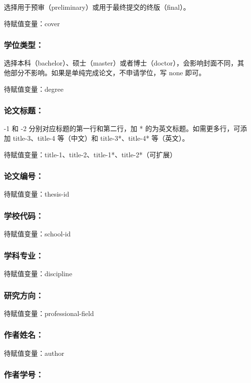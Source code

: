 选择用于预审（preliminary）或用于最终提交的终版（final）。

待赋值变量：cover

\subsubsection{学位类型：}

选择本科（bachelor）、硕士（master）或者博士（doctor），会影响封面不同，其他部分不影响。如果是单纯完成论文，不申请学位，写 none 即可。

待赋值变量：degree

\subsubsection{论文标题：}

-1 和 -2 分别对应标题的第一行和第二行，加 * 的为英文标题。如需更多行，可添加 title-3、title-4 等（中文）和 title-3*、title-4* 等（英文）。

待赋值变量：title-1、title-2、title-1*、title-2*（可扩展）

\subsubsection{论文编号：}

待赋值变量：thesis-id

\subsubsection{学校代码：}

待赋值变量：school-id

\subsubsection{学科专业：}

待赋值变量：discipline

\subsubsection{研究方向：}

待赋值变量：professional-field

\subsubsection{作者姓名：}

待赋值变量：author

\subsubsection{作者学号：}

